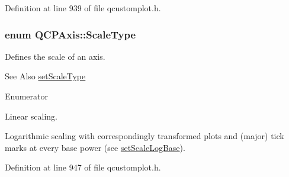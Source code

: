 Definition at line 939 of file qcustomplot.\-h.

\hypertarget{class_q_c_p_axis_a36d8e8658dbaa179bf2aeb973db2d6f0}{
\subsubsection[{Scale\-Type}]{\setlength{\rightskip}{0pt plus 5cm}enum {\bf Q\-C\-P\-Axis\-::\-Scale\-Type}}}\label{class_q_c_p_axis_a36d8e8658dbaa179bf2aeb973db2d6f0}
Defines the scale of an axis. \begin{DoxySeeAlso}{See Also}
\hyperlink{class_q_c_p_axis_adb6c5c45bdf899ea221881dd3b43b406}{set\-Scale\-Type} 
\end{DoxySeeAlso}
\begin{Desc}
\item[Enumerator]\par
\begin{description}
\item[{\em 
\hypertarget{class_q_c_p_axis_a36d8e8658dbaa179bf2aeb973db2d6f0aff6e30a11a828bc850caffab0ff994f6}{st\-Linear}\label{class_q_c_p_axis_a36d8e8658dbaa179bf2aeb973db2d6f0aff6e30a11a828bc850caffab0ff994f6}
}]Linear scaling. \item[{\em 
\hypertarget{class_q_c_p_axis_a36d8e8658dbaa179bf2aeb973db2d6f0abf5b785ad976618816dc6f79b73216d4}{st\-Logarithmic}\label{class_q_c_p_axis_a36d8e8658dbaa179bf2aeb973db2d6f0abf5b785ad976618816dc6f79b73216d4}
}]Logarithmic scaling with correspondingly transformed plots and (major) tick marks at every base power (see \hyperlink{class_q_c_p_axis_a726186054be90487885a748aa1b42188}{set\-Scale\-Log\-Base}). \end{description}
\end{Desc}


Definition at line 947 of file qcustomplot.\-h.

